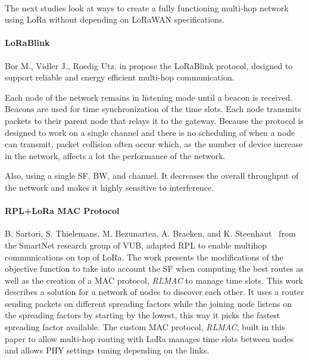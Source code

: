 \paragraph{}

The next studies look at ways to create a fully functioning multi-hop network
using LoRa without depending on LoRaWAN specifications.

\paragraph{LoRaBlink}

Bor M., Vidler J., Roedig Utz. in \cite{lorablink} propose the LoRaBlink
protocol, designed to support reliable and energy efficient multi-hop
communication.

Each node of the network remains in listening mode until a beacon is received.
Beacons are used for time synchronization of the time slots.
Each node transmits packets to their parent node that relays it to the gateway.
Because the protocol is designed to work on a single channel and
there is no scheduling of when a node can transmit, packet collision often occur
which, as the number of device increase in the network, affects a lot the
performance of the network.

Also, using a single SF, BW, and channel. It decreases the overall throughput
of the network and makes it highly sensitive to interference.

\paragraph{RPL+LoRa MAC Protocol}

B. Sartori, S. Thielemans, M. Bezunartea, A. Braeken, and K. Steenhaut~\cite{8115756}
from the SmartNet research group of VUB, adapted RPL
to enable multihop communications on top of LoRa.
The work presents the modifications of the objective function to take into
account the SF when computing the best routes as well as the creation of a MAC
protocol, \emph{RLMAC} to manage time slots.
This work describes a solution for a network of nodes to discover each other.
It uses a router sending packets on different spreading factors while the joining
node listens on the spreading factors by starting by the lowest, this way it
picks the fastest spreading factor available.
The custom MAC protocol, \emph{RLMAC}, built in this paper to allow multi-hop
routing with LoRa manages time slots between nodes and allows PHY settings
tuning depending on the links.

